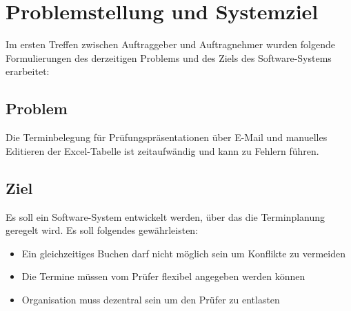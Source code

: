 \section{Problemstellung und Systemziel}
Im ersten Treffen zwischen Auftraggeber und Auftragnehmer wurden folgende Formulierungen des derzeitigen Problems und des Ziels des Software-Systems erarbeitet:

\subsection{Problem}
Die Terminbelegung für Prüfungspräsentationen über E-Mail und manuelles
Editieren der Excel-Tabelle ist zeitaufwändig und kann zu Fehlern
führen.

\subsection{Ziel}
Es soll ein Software-System entwickelt werden, über das die
Terminplanung geregelt wird. Es soll folgendes gewährleisten:
\begin{itemize}
  \item Ein gleichzeitiges Buchen darf nicht möglich sein um Konflikte zu vermeiden
  \item Die Termine müssen vom Prüfer flexibel angegeben werden können
  \item Organisation muss dezentral sein um den Prüfer zu entlasten
\end{itemize}
